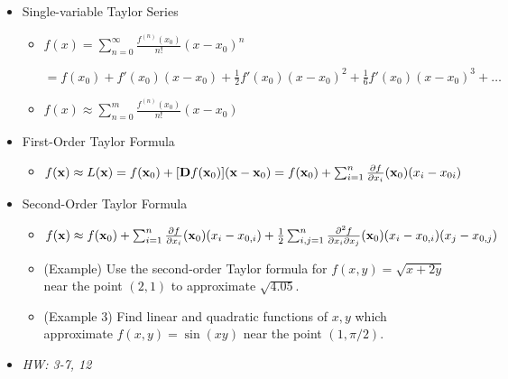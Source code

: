 \documentclass[11pt]{article}
\begin{document}
\begin{itemize}
  \item Single-variable Taylor Series
    \begin{itemize}
      \item
        \(\displaystyle
          f(x)
            =
          \sum_{n=0}^\infty \frac{f^{(n)}(x_0)}{n!}(x-x_0)^n
        \)

        \(\displaystyle
            =
          f(x_0)+f'(x_0)(x-x_0)+\frac{1}{2}f'(x_0)(x-x_0)^2
          +\frac{1}{6}f'(x_0)(x-x_0)^3+\dots
        \)
      \item
        \(\displaystyle
          f(x)
            \approx
          \sum_{n=0}^m \frac{f^{(n)}(x_0)}{n!}(x-x_0)
        \)
    \end{itemize}
  \item First-Order Taylor Formula
    \begin{itemize}
      \item
        \(
          f(\mathbf{x})
            \approx
          L(\mathbf{x})
            =
          f(\mathbf{x}_0) + [\mathbf{D}f(\mathbf{x}_0)](\mathbf{x} - \mathbf{x}_0)
            =
          f(\mathbf{x}_0)
            +
          \sum_{i=1}^{n}\frac{\partial f}{\partial x_i}(\mathbf{x}_0)(x_i - x_{0i})
        \)
    \end{itemize}
  \item Second-Order Taylor Formula
    \begin{itemize}
      \item
        \(
          f(\mathbf{x})
            \approx
          f(\mathbf{x}_0)
            +
          \sum_{i=1}^{n}\frac{\partial f}{\partial x_i}(\mathbf{x}_0)(x_i-x_{0,i})
            +
          \frac{1}{2}
          \sum_{i,j=1}^{n}\frac{\partial^2 f}{\partial x_i\partial x_j}(\mathbf{x}_0)(x_i-x_{0,i})(x_j-x_{0,j})
        \)
      \item
        (Example) Use the second-order Taylor formula for
        \(f(x,y)=\sqrt{x+2y}\) near the point \((2,1)\) to approximate
        \(\sqrt{4.05}\).
      \item
        (Example 3) Find linear and quadratic functions of \(x,y\) which
        approximate \(f(x,y)=\sin(xy)\) near the point \((1,\pi/2)\).
    \end{itemize}
  \item\textit{
    HW: 3-7, 12
  }
\end{itemize}

\end{document}
